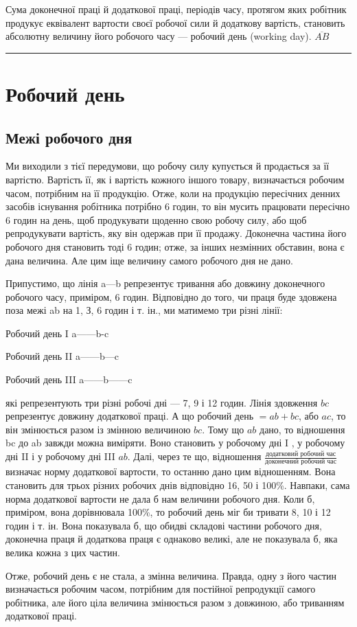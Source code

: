 Сума доконечної праці й додаткової праці, періодів часу,
протягом яких робітник продукує еквівалент вартости своєї робочої
сили й додаткову вартість, становить абсолютну величину
його робочого часу — робочий день (working day).
$\overline{AB}$
\noindent\rule{2cm}{0.4pt}

\section{Робочий день}
\subsection{Межі робочого дня}

Ми виходили з тієї передумови, що робочу силу купується
й продається за її вартістю. Вартість її, як і вартість кожного
іншого товару, визначається робочим часом, потрібним на
її продукцію. Отже, коли на продукцію пересічних денних засобів
існування робітника потрібно 6 годин, то він мусить працювати
пересічно 6 годин на день, щоб продукувати щоденно свою робочу
силу, або щоб репродукувати вартість, яку він одержав при її
продажу. Доконечна частина його робочого дня становить тоді
6 годин; отже, за інших незмінних обставин, вона є дана величина.
Але цим іще величину самого робочого дня не дано.

Припустимо, що лінія a---b репрезентує тривання
або довжину доконечного робочого часу, приміром, 6 годин. Відповідно
до того, чи праця буде здовжена поза межі ab на 1, З,
6 годин і т. ін., ми матимемо три різні лінії:

Робочий день I
a------b-c

Робочий день II
a------b---c

Робочий день III
a------b------c

\noindent{} які репрезентують три різні робочі дні — 7, 9 і 12 годин. Лінія
здовження $bc$ репрезентує довжину додаткової праці. А що робочий
день $= ab + bc$, або $ac$, то він змінюється разом із змінною
величиною $bc$. Тому що $ab$ дано, то відношення bc до ab завжди
можна виміряти. Воно становить у робочому дні I , у робочому
дні II  і у робочому дні III  $ab$. Далі, через те що, відношення
$\frac{\text{додатковий робочий час}}{\text{доконечний робочий час}}$ визначає норму додаткової вартости, то
останню дано цим відношенням. Вона становить для трьох різних
робочих днів відповідно 16, 50 і 100\%. Навпаки, сама норма
додаткової вартости не дала б нам величини робочого дня. Коли
б, приміром, вона дорівнювала 100\%, то робочий день міг би
тривати 8, 10 і 12 годин і т. ін. Вона показувала б, що обидві
складові частини робочого дня, доконечна праця й додаткова
праця є однаково великі, але не показувала б, яка велика кожна
з цих частин.

Отже, робочий день є не стала, а змінна величина. Правда,
одну з його частин визначається робочим часом, потрібним для
постійної репродукції самого робітника, але його ціла величина
змінюється разом з довжиною, або триванням додаткової праці.
\parbreak{}  %

